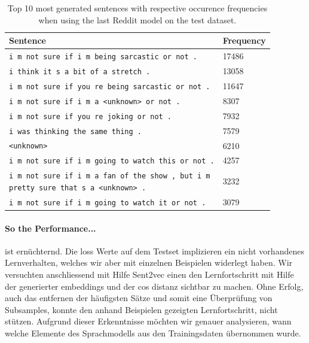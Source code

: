 \begin{table}[H]
	\centering
	\begin{adjustbox}{max width=\textwidth}
		\begin{tabular}{ll}
			\toprule
			Sentence & Frequency\\ \midrule
			\texttt{i m not sure if i m being sarcastic or not .} & 17486\\
			\texttt{i think it s a bit of a stretch .} & 13058\\
			\texttt{i m not sure if you re being sarcastic or not .} & 11647\\
			\texttt{i m not sure if i m a <unknown> or not .} & 8307\\
			\texttt{i m not sure if you re joking or not .} & 7932\\
			\texttt{i was thinking the same thing .} & 7579\\
			\texttt{<unknown>} & 6210\\
			\texttt{i m not sure if i m going to watch this or not .} & 4257\\
			\specialcell{\texttt{i m not sure if i m a fan of the show , but i m}\\\texttt{pretty sure that s a <unknown> .}} & 3232\\
			\texttt{i m not sure if i m going to watch it or not .} & 3079\\
			\bottomrule
		\end{tabular}
	\end{adjustbox}
	\caption{Top 10 most generated sentences with respective occurence frequencies when using the last Reddit model on the test dataset.}
	\label{results:test_performance:reddit_sample_outputs}
\end{table}

\paragraph{So the Performance...} ist ernüchternd. Die loss Werte auf dem Testset implizieren ein nicht vorhandenes Lernverhalten, welches wir aber mit einzelnen Beispielen widerlegt haben. Wir versuchten anschliessend mit Hilfe Sent2vec einen den Lernfortschritt mit Hilfe der generierter embeddings und der cos distanz sichtbar zu machen. Ohne Erfolg, auch das entfernen der häufigsten Sätze und somit eine Überprüfung von Subsamples, konnte den anhand Beispielen gezeigten Lernfortschritt, nicht stützen. Aufgrund dieser Erkenntnisse möchten wir genauer analysieren, wann welche Elemente des Sprachmodells aus den Trainingsdaten übernommen wurde.

